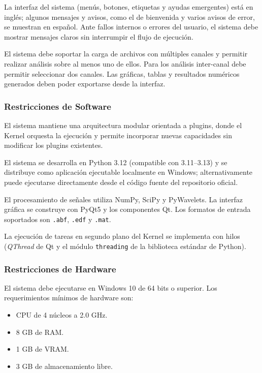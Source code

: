 \documentclass[12pt, letterpaper]{article}
\begin{document}
La interfaz del sistema (menús, botones, etiquetas y ayudas emergentes) está
en inglés; algunos mensajes y avisos, como el de bienvenida y varios avisos de
error, se muestran en español. Ante fallos internos o errores del usuario, el
sistema debe mostrar mensajes claros sin interrumpir el flujo de ejecución.

El sistema debe soportar la carga de archivos con múltiples canales y
permitir realizar análisis sobre al menos uno de ellos. Para los análisis
inter-canal debe permitir seleccionar dos canales. Las gráficas, tablas y
resultados numéricos generados deben poder exportarse desde la interfaz.

\subsubsection{Restricciones de Software}

El sistema mantiene una arquitectura modular orientada a plugins, donde el
Kernel orquesta la ejecución y permite incorporar nuevas capacidades sin
modificar los plugins existentes.

El sistema se desarrolla en Python 3.12 (compatible con 3.11--3.13) y se distribuye como
aplicación ejecutable localmente en Windows; alternativamente puede
ejecutarse directamente desde el código fuente del repositorio oficial.

El procesamiento de señales utiliza NumPy, SciPy y PyWavelets. La interfaz
gráfica se construye con PyQt5 y los componentes Qt. Los formatos de entrada soportados son \texttt{.abf}, \texttt{.edf} y
\texttt{.mat}.

La ejecución de tareas en segundo plano del Kernel se implementa con hilos
(\textit{QThread} de Qt y el módulo \texttt{threading} de la biblioteca
estándar de Python).

\subsubsection{Restricciones de Hardware}

El sistema debe ejecutarse en Windows 10 de 64 bits o superior. Los
requerimientos mínimos de hardware son:

\begin{itemize}

    \item CPU de 4 núcleos a 2.0 GHz.

    \item 8 GB de RAM.

    \item 1 GB de VRAM.

    \item 3 GB de almacenamiento libre.

\end{itemize}
\end{document}
